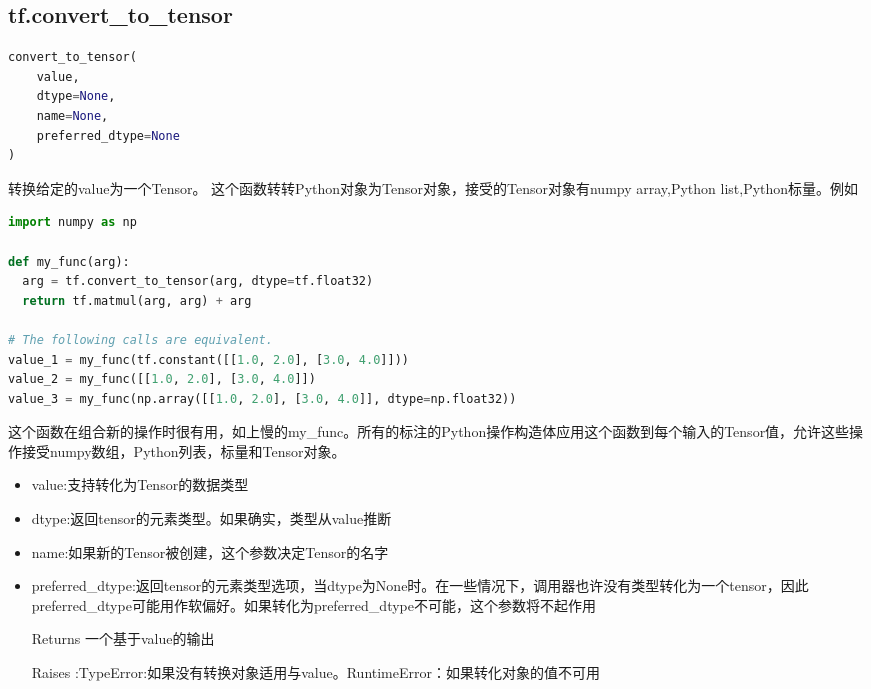 \subsection{tf.convert\_to\_tensor}
\begin{lstlisting}[language=Python]
convert_to_tensor(
    value,
    dtype=None,
    name=None,
    preferred_dtype=None
)
\end{lstlisting}
转换给定的value为一个Tensor。
这个函数转转Python对象为Tensor对象，接受的Tensor对象有numpy array,Python list,Python标量。例如
\begin{lstlisting}[language=Python]
import numpy as np

def my_func(arg):
  arg = tf.convert_to_tensor(arg, dtype=tf.float32)
  return tf.matmul(arg, arg) + arg

# The following calls are equivalent.
value_1 = my_func(tf.constant([[1.0, 2.0], [3.0, 4.0]]))
value_2 = my_func([[1.0, 2.0], [3.0, 4.0]])
value_3 = my_func(np.array([[1.0, 2.0], [3.0, 4.0]], dtype=np.float32))
\end{lstlisting}
这个函数在组合新的操作时很有用，如上慢的my\_func。所有的标注的Python操作构造体应用这个函数到每个输入的Tensor值，允许这些操作接受numpy数组，Python列表，标量和Tensor对象。
\begin{itemize}
\item value:支持转化为Tensor的数据类型
\item dtype:返回tensor的元素类型。如果确实，类型从value推断
\item name:如果新的Tensor被创建，这个参数决定Tensor的名字
\item preferred\_dtype:返回tensor的元素类型选项，当dtype为None时。在一些情况下，调用器也许没有类型转化为一个tensor，因此preferred\_dtype可能用作软偏好。如果转化为preferred\_dtype不可能，这个参数将不起作用
\item[Returns] 一个基于value的输出
\item[Raises]:TypeError:如果没有转换对象适用与value。RuntimeError：如果转化对象的值不可用
\end{itemize}


